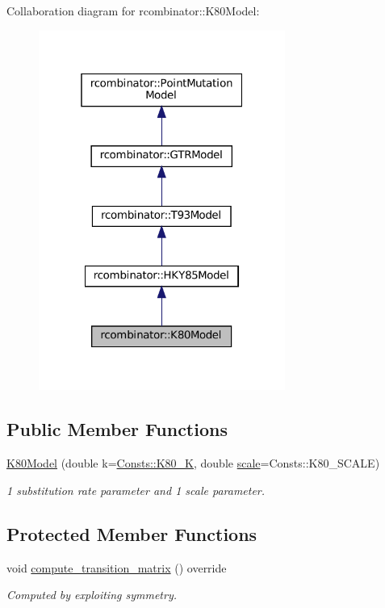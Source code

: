 Collaboration diagram for rcombinator\+:\+:K80\+Model\+:\nopagebreak
\begin{figure}[H]
\begin{center}
\leavevmode
\includegraphics[width=229pt]{classrcombinator_1_1K80Model__coll__graph}
\end{center}
\end{figure}
\subsection*{Public Member Functions}
\begin{DoxyCompactItemize}
\item 
\mbox{\hyperlink{classrcombinator_1_1K80Model_af199581e9a4d387f5e9e4f5bd048904b}{K80\+Model}} (double k=\mbox{\hyperlink{namespacercombinator_1_1Consts_af2e735f6e0661176144a8769131b8aa7}{Consts\+::\+K80\+\_\+K}}, double \mbox{\hyperlink{classrcombinator_1_1PointMutationModel_a328a30a438bb1b6a625faa3f714a85c8}{scale}}=Consts\+::\+K80\+\_\+\+S\+C\+A\+LE)
\begin{DoxyCompactList}\small\item\em 1 substitution rate parameter and 1 scale parameter. \end{DoxyCompactList}\end{DoxyCompactItemize}
\subsection*{Protected Member Functions}
\begin{DoxyCompactItemize}
\item 
\mbox{\label{classrcombinator_1_1K80Model_a70f669e2a31d34a37b19fd185219a9ce}} 
void \mbox{\hyperlink{classrcombinator_1_1K80Model_a70f669e2a31d34a37b19fd185219a9ce}{compute\+\_\+transition\+\_\+matrix}} () override
\begin{DoxyCompactList}\small\item\em Computed by exploiting symmetry. \end{DoxyCompactList}\end{DoxyCompactItemize}
